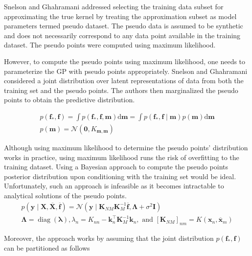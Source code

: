 \documentclass[letterpaper,11pt]{extarticle}
\begin{document}
Snelson and Ghahramani \cite{SnelsonEZ06} addressed selecting the training data subset for approximating the true kernel by treating the approximation subset as model parameters termed pseudo dataset. The pseudo data is assumed to be synthetic and does not necessarily correspond to any data point available in the training dataset. The pseudo points were computed using maximum likelihood. 

However, to compute the pseudo points using maximum likelihood, one needs to parameterize the GP with pseudo points appropriately. Snelson and Ghahramani \cite{SnelsonEZ06} considered a joint distribution over latent representations of data from both the training set and the pseudo points. The authors then marginalized the pseudo points to obtain the predictive distribution. 

$$
\begin{array}{l}
p\left(\mathbf{f}_{*}, \mathbf{f}\right)=\int p\left(\mathbf{f}_{*}, \mathbf{f}, \mathbf{m}\right) \mathrm{d} \mathbf{m}=\int p\left(\mathbf{f}_{*}, \mathbf{f} \mid \mathbf{m}\right) p(\mathbf{m}) \mathrm{d} \mathbf{m} \\
p(\mathbf{m})=\mathcal{N}\left(\mathbf{0}, K_{\mathbf{m}, \mathbf{m}}\right)
\end{array}
$$

Although using maximum likelihood to determine the pseudo points' distribution works in practice, using maximum likelihood runs the risk of overfitting to the training dataset. Using a Bayesian approach to compute the pseudo points posterior distribution upon conditioning with the training set would be ideal. Unfortunately, such an approach is infeasible as it becomes intractable to analytical solutions of the pseudo points.
$$
\begin{array}{c}
p(\mathbf{y} \mid \mathbf{X}, \overline{\mathbf{X}}, \overline{\mathbf{f}})=\mathcal{N}\left(\mathbf{y} \mid \mathbf{K}_{N M} \mathbf{K}_{M}^{-1} \overline{\mathbf{f}}, \mathbf{\Lambda}+\sigma^{2} \mathbf{I}\right) \\
\mathbf{\Lambda}=\operatorname{diag}(\boldsymbol{\lambda}), \lambda_{n}=K_{n n}-\mathbf{k}_{n}^{\top} \mathbf{K}_{M}^{-1} \mathbf{k}_{n}, \text { and }\left[\mathbf{K}_{N M}\right]_{n m}=K\left(\mathbf{x}_{n}, \overline{\mathbf{x}}_{m}\right)
\end{array}
$$

Moreover, the approach works by assuming that the joint distribution $p\left(\mathbf{f}_{*}, \mathbf{f}\right)$ can be partitioned as follows
\end{document}
